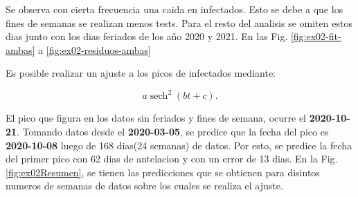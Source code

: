 \documentclass[twocolumn,aps,prl]{revtex4-1}
\begin{document}
Se observa con cierta frecuencia una caida en infectados. Esto se debe a que los fines de semanas se realizan menos tests. Para el resto del analisis se omiten estos dias junto con los dias feriados de los año 2020 y 2021. En las Fig. \ref{fig:ex02-fit-ambas} a \ref{fig:ex02-residuos-ambas}

Es posible realizar un ajuste a los picos de infectados mediante:

\begin{equation} \label{eq:pico}
  a \operatorname{sech} ^2 \left( bt + c \right).
\end{equation}

El pico que figura en los datos sin feriados y fines de semana, ocurre el \textbf{2020-10-21}. Tomando datos desde el \textbf{2020-03-05}, se predice que la fecha del pico es \textbf{2020-10-08} luego de 168 dias(24 semanas) de datos. Por esto, se predice la fecha del primer pico con 62 dias de antelacion y con un error de 13 dias. En la Fig. \ref{fig:ex02Resumen}, se tienen las predicciones que se obtienen para disintos numeros de semanas de datos sobre los cuales se realiza el ajuste. 
\end{document}
